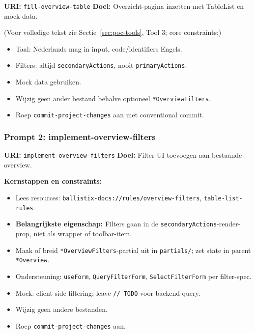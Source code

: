 \noindent
\textbf{URI:} \texttt{fill-overview-table} \newline
\textbf{Doel:} Overzicht-pagina inzetten met TableList en mock data.

\noindent
(Voor volledige tekst zie Sectie~\ref{sec:poc-tools}, Tool 3; core constraints:)

\begin{itemize}
  \item Taal: Nederlands mag in input, code/identifiers Engels.
  \item Filters: altijd \texttt{secondaryActions}, nooit \texttt{primaryActions}.
  \item Mock data gebruiken.
  \item Wijzig geen ander bestand behalve optioneel \texttt{*OverviewFilters}.
  \item Roep \texttt{commit-project-changes} aan met conventional commit.
\end{itemize}

\subsubsection{Prompt 2: implement-overview-filters}

\noindent
\textbf{URI:} \texttt{implement-overview-filters} \newline
\textbf{Doel:} Filter-UI toevoegen aan bestaande overview.

\noindent
\textbf{Kernstappen en constraints:}

\begin{itemize}
  \item Lees resources: \texttt{ballistix-docs://rules/overview-filters}, \texttt{table-list-rules}.
  \item \textbf{Belangrijkste eigenschap:} Filters gaan in de \texttt{secondaryActions}-render-prop, niet als wrapper of toolbar-item.
  \item Maak of breid \texttt{*OverviewFilters}-partial uit in \texttt{partials/}; zet state in parent \texttt{*Overview}.
  \item Ondersteuning: \texttt{useForm}, \texttt{QueryFilterForm}, \texttt{SelectFilterForm} per filter-spec.
  \item Mock: client-side filtering; leave \texttt{// TODO} voor backend-query.
  \item Wijzig geen andere bestanden.
  \item Roep \texttt{commit-project-changes} aan.
\end{itemize}

